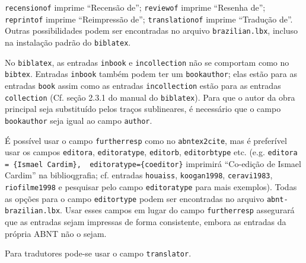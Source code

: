 \documentclass[a4paper]{article}
\begin{document}
\begin{itemize}
\begin{sloppypar}
    \texttt{recensionof} imprime ``Recensão de''; \texttt{reviewof} imprime
    ``Resenha de''; \texttt{reprintof} imprime ``Reimpressão de'';
    \texttt{translationof} imprime ``Tradução de''. Outras possibilidades
    podem ser encontradas no arquivo \texttt{brazilian.lbx}, incluso na
    instalação padrão do \texttt{biblatex}.
  \item No \texttt{biblatex}, as entradas \texttt{inbook} e
    \texttt{incollection} não se comportam como no \texttt{bibtex}. Entradas
    \texttt{inbook} também podem ter um \texttt{bookauthor}; elas estão para
    as entradas \texttt{book} assim como as entradas \texttt{incollection}
    estão para as entradas \texttt{collection} (Cf. seção 2.3.1 do manual
    do \texttt{biblatex}). Para que o autor da obra principal seja
    substituído pelos traços sublineares, é necessário que o campo
    \texttt{bookauthor} seja igual ao campo \texttt{author}.
  \item É possível usar o campo \texttt{furtherresp} como no
    \texttt{abntex2cite}, mas é preferível usar os campos \texttt{editora},
    \texttt{editoratype}, \texttt{editorb}, \texttt{editorbtype} etc. (e.g.
    \verb"editora = {Ismael Cardim},  editoratype={coeditor}" imprimirá
    ``Co-edição de Ismael Cardim'' na biblioqgrafia; cf. entradas
    \texttt{hou\-a\-iss}, \texttt{koogan1998}, \texttt{ceravi1983},
    \texttt{riofilme1998} e pesquisar pelo campo \texttt{editor\-a\-type} para
    mais exemplos). Todas as opções para o campo \texttt{editor\-type} podem
    ser encontradas no arquivo \texttt{abnt-brazilian.lbx}. Usar esses campos
    em lugar do campo \texttt{furtherresp} assegurará que as entradas sejam
    impressas de forma consistente, embora as entradas da própria ABNT não o
    sejam.
  \item Para tradutores pode-se usar o campo \texttt{translator}.
  \end{sloppypar}
\end{itemize}

\clearpage
\nocite{*}
\printbibliography
\end{document}
